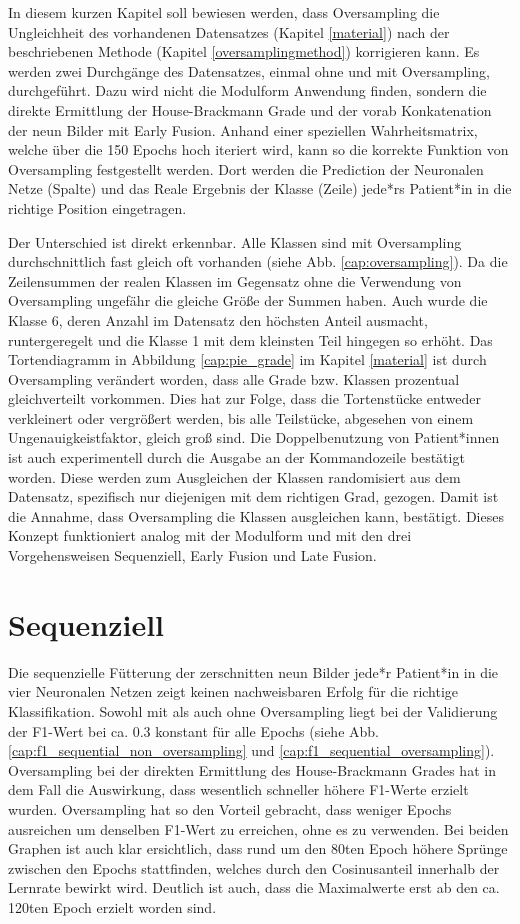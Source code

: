 In diesem kurzen Kapitel soll bewiesen werden, dass Oversampling die Ungleichheit des vorhandenen Datensatzes (Kapitel \ref{material}) nach der beschriebenen Methode (Kapitel \ref{oversamplingmethod}) korrigieren kann. Es werden zwei Durchgänge des Datensatzes, einmal ohne und mit Oversampling, durchgeführt. Dazu wird nicht die Modulform Anwendung finden, sondern die direkte Ermittlung der House-Brackmann Grade und der vorab Konkatenation der neun Bilder mit Early Fusion. Anhand einer speziellen Wahrheitsmatrix, welche über die 150 Epochs hoch iteriert wird, kann so die korrekte Funktion von Oversampling festgestellt werden. Dort werden die Prediction der Neuronalen Netze (Spalte) und das Reale Ergebnis der Klasse (Zeile) jede*rs Patient*in in die richtige Position eingetragen.

Der Unterschied ist direkt erkennbar. Alle Klassen sind mit Oversampling durchschnittlich fast gleich oft vorhanden (siehe Abb. \ref{cap:oversampling}). Da die Zeilensummen der realen Klassen im Gegensatz ohne die Verwendung von Oversampling ungefähr die gleiche Größe der Summen haben. Auch wurde die Klasse 6, deren Anzahl im Datensatz den höchsten Anteil ausmacht, runtergeregelt und die Klasse 1 mit dem kleinsten Teil hingegen so erhöht. Das Tortendiagramm in Abbildung \ref{cap:pie_grade} im Kapitel \ref{material} ist durch Oversampling verändert worden, dass alle Grade bzw. Klassen prozentual gleichverteilt vorkommen. Dies hat zur Folge, dass die Tortenstücke entweder verkleinert oder vergrößert werden, bis alle Teilstücke, abgesehen von einem Ungenauigkeistfaktor, gleich groß sind. Die Doppelbenutzung von Patient*innen ist auch experimentell durch die Ausgabe an der Kommandozeile bestätigt worden. Diese werden zum Ausgleichen der Klassen randomisiert aus dem Datensatz, spezifisch nur diejenigen mit dem richtigen Grad, gezogen. Damit ist die Annahme, dass Oversampling die Klassen ausgleichen kann, bestätigt. Dieses Konzept funktioniert analog mit der Modulform und mit den drei Vorgehensweisen Sequenziell, Early Fusion und Late Fusion.




\clearpage
\section{Sequenziell}\label{sequent}
Die sequenzielle Fütterung der zerschnitten neun Bilder jede*r Patient*in in die vier Neuronalen Netzen zeigt keinen nachweisbaren Erfolg für die richtige Klassifikation. Sowohl mit als auch ohne Oversampling liegt bei der Validierung der F1-Wert bei ca. 0.3 konstant für alle Epochs (siehe Abb. \ref{cap:f1_sequential_non_oversampling} und \ref{cap:f1_sequential_oversampling}). Oversampling bei der direkten Ermittlung des House-Brackmann Grades hat in dem Fall die Auswirkung, dass wesentlich schneller höhere F1-Werte erzielt wurden. Oversampling hat so den Vorteil gebracht, dass weniger Epochs ausreichen um denselben F1-Wert zu erreichen, ohne es zu verwenden. Bei beiden Graphen ist auch klar ersichtlich, dass rund um den 80ten Epoch höhere Sprünge zwischen den Epochs stattfinden, welches durch den Cosinusanteil innerhalb der Lernrate bewirkt wird. Deutlich ist auch, dass die Maximalwerte erst ab den ca. 120ten Epoch erzielt worden sind.

